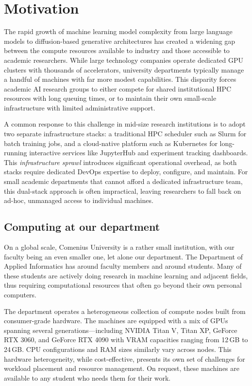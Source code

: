 \section{Motivation}

The rapid growth of machine learning model complexity from large language models to diffusion-based generative architectures has created a widening gap between the compute resources available to industry and those accessible to academic researchers. While large technology companies operate dedicated GPU clusters with thousands of accelerators, university departments typically manage a handful of machines with far more modest capabilities. This disparity forces academic AI research groups to either compete for shared institutional HPC resources with long queuing times, or to maintain their own small-scale infrastructure with limited administrative support.

A common response to this challenge in mid-size research institutions is to adopt two separate infrastructure stacks: a traditional HPC scheduler such as Slurm for batch training jobs, and a cloud-native platform such as Kubernetes for long-running interactive services like JupyterHub and experiment tracking dashboards. This \emph{infrastructure sprawl} introduces significant operational overhead, as both stacks require dedicated DevOps expertise to deploy, configure, and maintain. For small academic departments that cannot afford a dedicated infrastructure team, this dual-stack approach is often impractical, leaving researchers to fall back on ad-hoc, unmanaged access to individual machines.

\subsection{Computing at our department}

On a global scale, Comenius University is a rather small institution, with our faculty being an even smaller one, let alone our department. The Department of Applied Informatics has around  faculty members and around  students. Many of these students are actively doing research in machine learning and adjacent fields, thus requiring computational resources that often go beyond their own personal computers.

The department operates a heterogeneous collection of compute nodes built from consumer-grade hardware. The machines are equipped with a mix of GPUs spanning several generations---including NVIDIA Titan V, Titan XP, GeForce RTX 3060, and GeForce RTX 4090 with VRAM capacities ranging from 12\,GB to 24\,GB. CPU configurations and RAM sizes similarly vary across nodes. This hardware heterogeneity, while cost-effective, presents its own set of challenges for workload placement and resource management. On request, these machines are available to any student who needs them for their work.

